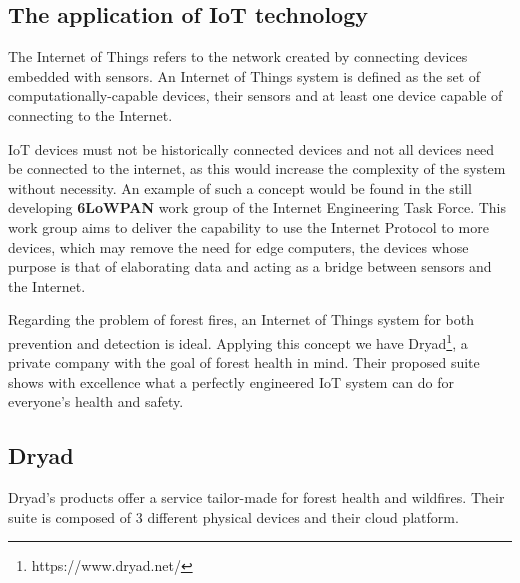 \documentclass[11pt]{article}
\begin{document}
\subsection{The application of IoT technology}
The Internet of Things refers to the network created by connecting devices embedded with sensors. An Internet of Things system is defined as the set of computationally-capable devices, their sensors and at least one device capable of connecting to the Internet. \par
\vspace{0.5 cm}

IoT devices must not be historically connected devices and not all devices need be connected to the internet, as this would increase the complexity of the system without necessity. An example of such a concept would be found in the still developing \textbf{6LoWPAN} work group of the Internet Engineering Task Force. This work group aims to deliver the capability to use the Internet Protocol to more devices, which may remove the need for edge computers, the devices whose purpose is that of elaborating data and acting as a bridge between sensors and the Internet. \par
\vspace{0.5 cm}
Regarding the problem of forest fires, an Internet of Things system for both prevention and detection is ideal. Applying this concept we have Dryad\footnote{https://www.dryad.net/}, a private company with the goal of forest health in mind. Their proposed suite shows with excellence what a perfectly engineered IoT system can do for everyone's health and safety. \par
\vspace{0.5 cm}
\newpage
\subsection{Dryad}
Dryad's products offer a service tailor-made for forest health and wildfires. Their suite is composed of 3 different physical devices and their cloud platform.
\end{document}
